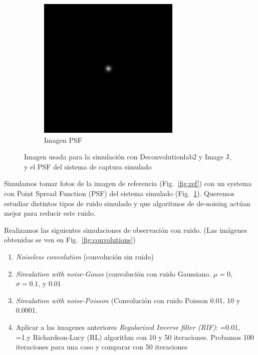 \documentclass{./packages/optica-article}
\begin{document}
\begin{figure}[hbp]
\begin{subfigure}[t]{0.45\textwidth}
		\includegraphics[width=\textwidth]{Simulation deconvolution/psf.jpg}
		\caption{Imagen PSF}\label{fig:psf}
	\end{subfigure}
	\caption{Imagen usada para la simulación con Deconvolutionlab2 y Image J, y el PSF del sistema de captura simulado}\label{fig:image:ref-psf}
\end{figure}

 Simulamos tomar fotos de la imagen de referencia (Fig.~\ref{fig:ref}) con un systema con Point Spread Function (PSF) del sistema simulado (Fig.~\ref{fig:psf}). Queremos estudiar distintos tipos de ruido simulado y que algoritmos de de-noising actúan mejor para reducir este ruido.

 Realizamos las siguientes simulaciones de observación con ruido. (Las imágenes obtenidas se ven en Fig.~\ref{fig:convolutions})

\begin{enumerate}
    \item \emph{Noiseless convolution} (convolución sin ruido)
    \item \emph{Simulation with noise-Gauss} (convolución con ruido Gaussiano. $\mu=0$, $\sigma=0.1$, y $0.01$
    \item \emph{Simulation with noise-Poisson} (Convolución con ruido Poisson 0.01, 10 y 0.0001.
    \item Aplicar a las imagenes anteriores \emph{Regularized Inverse filter (RIF)}: =0.01, =1.y Richardson-Lucy (RL) algorithm con 10 y 50 iteraciones. Probamos 100 iteraciones para una caso y comparar con 50 iteraciones
\end{enumerate}
\end{document}
